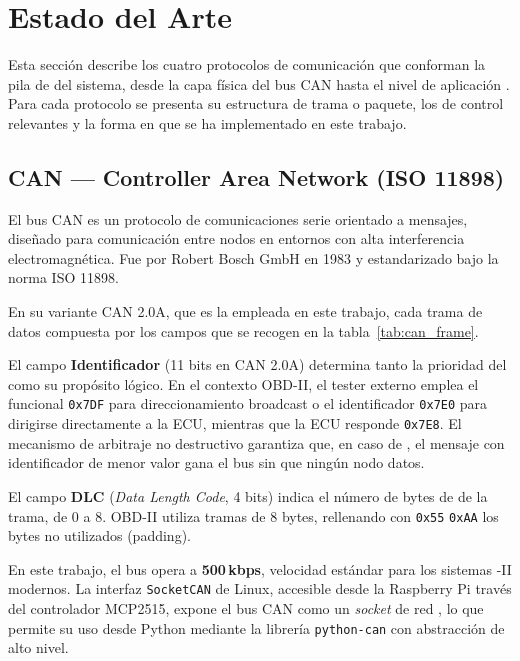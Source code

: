 \section{Estado del Arte}
\label{sec:protocolos}

Esta sección describe los cuatro protocolos de comunicación que conforman la pila de  del sistema, desde la capa física del bus CAN hasta el nivel de aplicación . Para cada protocolo se presenta su estructura de trama o paquete, los  de control relevantes y la forma en que se ha implementado en este trabajo.


\subsection{CAN — Controller Area Network (ISO 11898)}
\label{sec:proto_can}

El bus CAN es un protocolo de comunicaciones serie orientado a mensajes, diseñado para  comunicación entre nodos en entornos con alta interferencia electromagnética. Fue  por Robert Bosch GmbH en 1983 y estandarizado bajo la norma ISO 11898.

En su variante CAN 2.0A, que es la empleada en este trabajo, cada trama de datos  compuesta por los campos que se recogen en la tabla~\ref{tab:can_frame}.

% 

El campo \textbf{Identificador} (11 bits en CAN 2.0A) determina tanto la prioridad del  como su propósito lógico. En el contexto OBD-II, el tester externo emplea el  funcional \texttt{0x7DF} para direccionamiento broadcast o el identificador  \texttt{0x7E0} para dirigirse directamente a la ECU, mientras que la ECU responde  \texttt{0x7E8}. El mecanismo de arbitraje no destructivo garantiza que, en caso de , el mensaje con identificador de menor valor gana el bus sin que ningún nodo  datos.

El campo \textbf{DLC} (\textit{Data Length Code}, 4 bits) indica el número de bytes de  de la trama, de 0 a 8. OBD-II utiliza tramas de 8 bytes, rellenando con \texttt{0x55}  \texttt{0xAA} los bytes no utilizados (padding).

En este trabajo, el bus opera a \textbf{500\,kbps}, velocidad estándar para los sistemas -II modernos. La interfaz \texttt{SocketCAN} de Linux, accesible desde la Raspberry Pi  través del controlador MCP2515, expone el bus CAN como un \textit{socket} de red , lo que permite su uso desde Python mediante la librería \texttt{python-can} con  abstracción de alto nivel.


